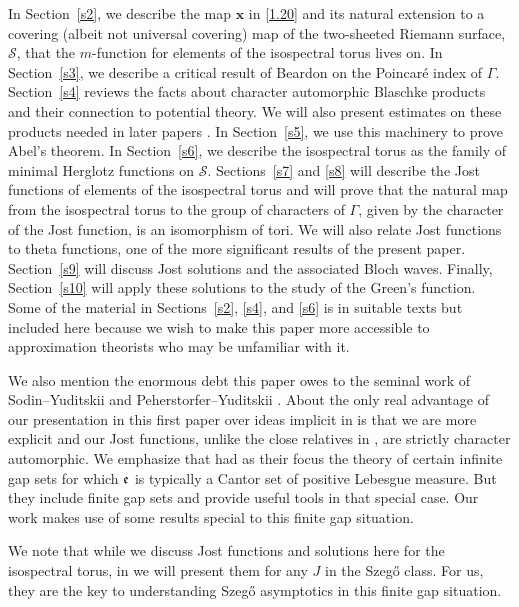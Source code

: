 \documentclass[reqno,centertags, 12pt]{amsart}
\numberwithin{equation}{section}
\theoremstyle{definition}
\begin{document}
In Section~\ref{s2}, we describe the map ${{\mathbf{x}}}$ in \eqref{1.20} and its natural extension to a covering
(albeit not universal covering) map of the two-sheeted Riemann surface, ${{\mathcal S}}$, that the $m$-function
for elements of the isospectral torus lives on. In Section~\ref{s3}, we describe a critical result of
Beardon \cite{Bear} on the Poincar\'e index of $\Gamma$. Section~\ref{s4} reviews the facts about
character automorphic Blaschke products and their connection to potential theory. We will also present
estimates on these products needed in later papers \cite{CSZ2,CSZ3}. In Section~\ref{s5}, we use this
machinery to prove Abel's theorem. In Section~\ref{s6}, we describe the isospectral torus as the family
of minimal Herglotz functions on ${{\mathcal S}}$. Sections~\ref{s7} and \ref{s8} will describe the Jost functions
of elements of the isospectral torus and will prove that the natural map from the isospectral torus to the
group of characters of $\Gamma$, given by the character of the Jost function, is an isomorphism of tori.
We will also relate Jost functions to theta functions, one of the more significant results of the present
paper. Section~\ref{s9} will discuss Jost solutions and the associated Bloch waves. Finally, Section~\ref{s10}
will apply these solutions to the study of the Green's function. Some of the material in Sections~\ref{s2},
\ref{s4}, and \ref{s6} is in suitable texts but included here because we wish to make this paper more
accessible to approximation theorists who may be unfamiliar with it.

We also mention the enormous debt this paper owes to the seminal work of Sodin--Yuditskii \cite{SY} and
Peherstorfer--Yuditskii \cite{PY}. About the only real advantage of our presentation in this first
paper over ideas implicit in \cite{SY,PY} is that we are more explicit and our Jost functions,
unlike the close relatives in \cite{SY,PY}, are strictly character automorphic. We emphasize that \cite{SY,PY}
had as their focus the theory of certain infinite gap sets for which ${{\frak{e}}}$ is typically a Cantor set of
positive Lebesgue measure. But they include finite gap sets and provide useful tools in that special case.
Our work makes use of some results special to this finite gap situation.

We note that while we discuss Jost functions and solutions here for the isospectral torus, in
\cite{CSZ2,CSZ3} we will present them for any $J$ in the Szeg\H{o} class. For us, they are the key
to understanding Szeg\H{o} asymptotics in this finite gap situation.
\end{document}
